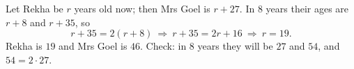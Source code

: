Let Rekha be $r$ years old now; then Mrs Goel is $r+27$. In $8$ years their ages are $r+8$ and $r+35$, so
\[
r+35=2(r+8)\ \Longrightarrow\ r+35=2r+16\ \Longrightarrow\ r=19 .
\]
Rekha is $\boxed{19}$ and Mrs Goel is $\boxed{46}$. Check: in $8$ years they will be $27$ and $54$, and $54=2\cdot27$.
